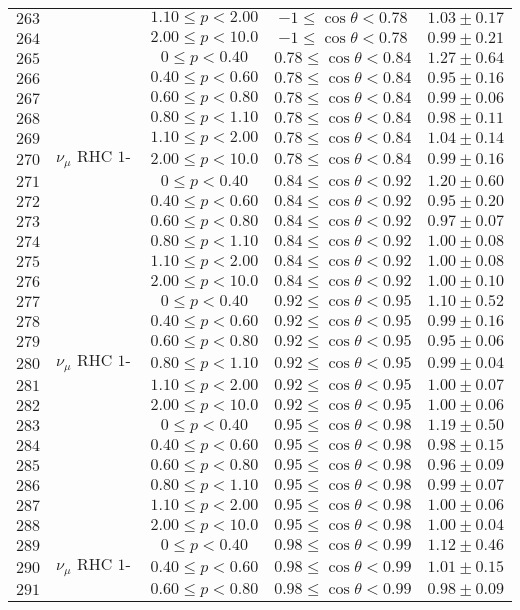 \begin{longtable}[c]{ccccc}
$263$ &  & $1.10\leq p<2.00$ & $-1\leq\cos\theta<0.78$ & $1.03\pm0.17$\tabularnewline
$264$ &  & $2.00\leq p<10.0$ & $-1\leq\cos\theta<0.78$ & $0.99\pm0.21$\tabularnewline
$265$ &  & $0\leq p<0.40$ & $0.78\leq\cos\theta<0.84$ & $1.27\pm0.64$\tabularnewline
$266$ &  & $0.40\leq p<0.60$ & $0.78\leq\cos\theta<0.84$ & $0.95\pm0.16$\tabularnewline
$267$ &  & $0.60\leq p<0.80$ & $0.78\leq\cos\theta<0.84$ & $0.99\pm0.06$\tabularnewline
$268$ &  & $0.80\leq p<1.10$ & $0.78\leq\cos\theta<0.84$ & $0.98\pm0.11$\tabularnewline
$269$ &  & $1.10\leq p<2.00$ & $0.78\leq\cos\theta<0.84$ & $1.04\pm0.14$\tabularnewline
$270$ & $\nu_{\mu}\text{ RHC 1-Trk Wtr}$ & $2.00\leq p<10.0$ & $0.78\leq\cos\theta<0.84$ & $0.99\pm0.16$\tabularnewline
$271$ &  & $0\leq p<0.40$ & $0.84\leq\cos\theta<0.92$ & $1.20\pm0.60$\tabularnewline
$272$ &  & $0.40\leq p<0.60$ & $0.84\leq\cos\theta<0.92$ & $0.95\pm0.20$\tabularnewline
$273$ &  & $0.60\leq p<0.80$ & $0.84\leq\cos\theta<0.92$ & $0.97\pm0.07$\tabularnewline
$274$ &  & $0.80\leq p<1.10$ & $0.84\leq\cos\theta<0.92$ & $1.00\pm0.08$\tabularnewline
$275$ &  & $1.10\leq p<2.00$ & $0.84\leq\cos\theta<0.92$ & $1.00\pm0.08$\tabularnewline
$276$ &  & $2.00\leq p<10.0$ & $0.84\leq\cos\theta<0.92$ & $1.00\pm0.10$\tabularnewline
$277$ &  & $0\leq p<0.40$ & $0.92\leq\cos\theta<0.95$ & $1.10\pm0.52$\tabularnewline
$278$ &  & $0.40\leq p<0.60$ & $0.92\leq\cos\theta<0.95$ & $0.99\pm0.16$\tabularnewline
$279$ &  & $0.60\leq p<0.80$ & $0.92\leq\cos\theta<0.95$ & $0.95\pm0.06$\tabularnewline
$280$ & $\nu_{\mu}\text{ RHC 1-Trk Wtr}$ & $0.80\leq p<1.10$ & $0.92\leq\cos\theta<0.95$ & $0.99\pm0.04$\tabularnewline
$281$ &  & $1.10\leq p<2.00$ & $0.92\leq\cos\theta<0.95$ & $1.00\pm0.07$\tabularnewline
$282$ &  & $2.00\leq p<10.0$ & $0.92\leq\cos\theta<0.95$ & $1.00\pm0.06$\tabularnewline
$283$ &  & $0\leq p<0.40$ & $0.95\leq\cos\theta<0.98$ & $1.19\pm0.50$\tabularnewline
$284$ &  & $0.40\leq p<0.60$ & $0.95\leq\cos\theta<0.98$ & $0.98\pm0.15$\tabularnewline
$285$ &  & $0.60\leq p<0.80$ & $0.95\leq\cos\theta<0.98$ & $0.96\pm0.09$\tabularnewline
$286$ &  & $0.80\leq p<1.10$ & $0.95\leq\cos\theta<0.98$ & $0.99\pm0.07$\tabularnewline
$287$ &  & $1.10\leq p<2.00$ & $0.95\leq\cos\theta<0.98$ & $1.00\pm0.06$\tabularnewline
$288$ &  & $2.00\leq p<10.0$ & $0.95\leq\cos\theta<0.98$ & $1.00\pm0.04$\tabularnewline
$289$ &  & $0\leq p<0.40$ & $0.98\leq\cos\theta<0.99$ & $1.12\pm0.46$\tabularnewline
$290$ & $\nu_{\mu}\text{ RHC 1-Trk Wtr}$ & $0.40\leq p<0.60$ & $0.98\leq\cos\theta<0.99$ & $1.01\pm0.15$\tabularnewline
$291$ &  & $0.60\leq p<0.80$ & $0.98\leq\cos\theta<0.99$ & $0.98\pm0.09$\tabularnewline

\end{longtable}

